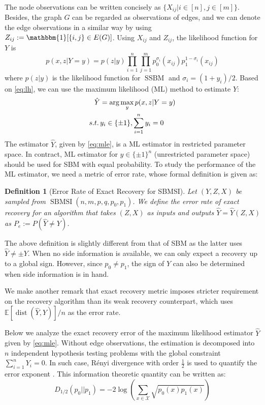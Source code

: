 \documentclass[conference,letterpaper]{IEEEtran}
\newtheorem{definition}{Definition}
\DeclareMathOperator{\SSBM}{SSBM}
\DeclareMathOperator{\SBMSI}{SBMSI}
\DeclareMathOperator{\dist}{dist}
\begin{document}
The node observations can be written concisely as $\{X_{ij} | i \in [n], j \in [m]\}$. Besides, the graph $G$ can be regarded as observations of edges, and
we can denote the edge observations in a similar way by using $Z_{ij}:=\mathbbm{1}[\{i,j\} \in E(G)]$.
Using $X_{ij}$ and $Z_{ij}$, the likelihood function for $Y$ is
\begin{equation}\label{eq:lh}
    p(x, z| Y=y) = p(z|y)\prod_{i=1}^n \prod_{j=1}^m p^{\sigma_i}_0(x_{ij})p^{1-\sigma_i}_1(x_{ij}) 
\end{equation}
where $p(z|y)$ is the likelihood function for $\SSBM$ and $\sigma_i = (1+y_i)/2$.
Based on \eqref{eq:lh}, we can use the maximum likelihood (ML) method to estimate
$Y$:
\begin{align}
    \hat{Y} &= \arg\max_y p(x,z|Y=y) \notag \\
    s.t.\, & y_i \in \{\pm 1\}, \sum_{i=1}^n y_i=0 \label{eq:mle}
\end{align}
The estimator $\hat{Y}$, given by \eqref{eq:mle}, is a ML estimator in restricted parameter space.
In contract,
ML estimator for $y\in \{ \pm 1 \}^n$ (unrestricted parameter space)
should be used for SBM with equal probability.
To study the performance of the ML estimator, we need a metric of error rate,
whose formal definition is given as:
\begin{definition}[Error Rate of Exact Recovery for SBMSI]
		Let $(Y,Z,X)$ be sampled from $\SBMSI(n,m,p,q,p_0, p_1)$.
		We define the error rate of exact recovery for an algorithm that takes $(Z,X)$ as inputs and outputs $\hat{Y}=\hat{Y}(Z,X)$ as
		$P_e:=P(\hat{Y} \neq Y)$.
\end{definition}
The above definition is slightly different from that of SBM as the latter uses $\hat{Y} \neq \pm Y$.
When no side information is available, we can only expect a recovery up to a global sign. However,
since $p_0 \neq p_1$, the sign of $Y$ can also be determined when side information is in hand.

We make another remark that exact recovery metric imposes stricter requirement on the recovery algorithm than its weak recovery
counterpart, which uses $\mathbb{E}[\dist(\hat{Y}, Y)]/n$ as the error rate.

Below we analyze the exact recovery error of the maximum likelihood estimator $\hat{Y}$
given by \eqref{eq:mle}.
Without edge observations, the estimation is decomposed into $n$
independent hypothesis testing problems with the global constraint $\sum_{i=1}^n Y_i=0$. 
In such case, Rényi divergence with order $\frac{1}{2}$
is used to quantify the error exponent \cite{gao2018community}.
This information theoretic quantity can be written as:
\begin{equation}
D_{1/2}(p_0 || p_1) = -2\log(\sum_{x \in \mathcal{X}} \sqrt{p_0(x)p_1(x)} )
\end{equation}
\end{document}

